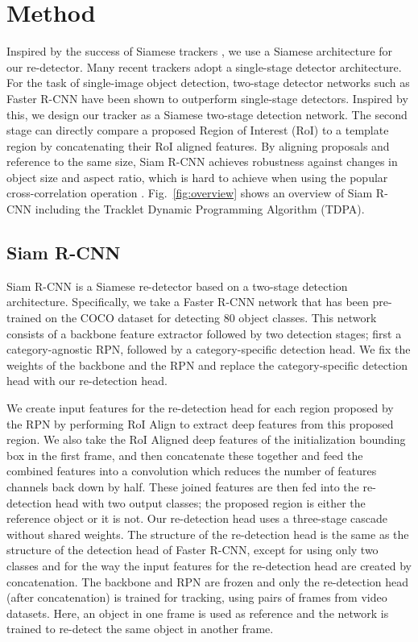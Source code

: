 \documentclass[10pt,twocolumn,letterpaper]{article}
\begin{document}
\section{Method}
Inspired by the success of Siamese trackers \cite{Kristan18ECCVW,Wu15TPAMI,Kristan16TPAMI}, we use a Siamese  architecture for our re-detector.
 Many recent trackers \cite{Zhu18ECCV,Wang19CVPR,Li19CVPR,Li18CVPRSiamRPN,Bhat19ICCV} adopt a single-stage detector architecture. For the task of single-image object detection, two-stage detector networks such as Faster R-CNN \cite{Ren15NIPS} have been shown to outperform single-stage detectors. Inspired by this, we design our tracker as a Siamese two-stage detection network. The second stage can directly compare a proposed Region of Interest (RoI) to a template region by concatenating their RoI aligned features. By aligning proposals and reference to the same size, Siam R-CNN achieves robustness against changes in object size and aspect ratio, which is hard to achieve when using the popular cross-correlation operation \cite{Li18CVPRSiamRPN}.
 Fig.~\ref{fig:overview} shows an overview of Siam R-CNN including the Tracklet Dynamic Programming Algorithm (TDPA).

\subsection{Siam R-CNN}
Siam R-CNN is a Siamese re-detector based on a two-stage detection architecture. Specifically, we take a Faster R-CNN network that has been pre-trained on the COCO \cite{coco} dataset for detecting 80 object classes. This network consists of a backbone feature extractor followed by two detection stages; first a category-agnostic RPN, followed by a category-specific detection head. We fix the weights of the backbone and the RPN and replace the category-specific detection head with our re-detection head.

We create input features for the re-detection head for each region proposed by the RPN by performing RoI Align \cite{He17ICCV} to extract deep features from this proposed region. We also take the RoI Aligned deep features of the initialization bounding box in the first frame, and then concatenate these together and feed the combined features into a  convolution which reduces the number of features channels back down by half.
These joined features are then fed into the re-detection head with two output classes; the proposed region is either the reference object or it is not.
Our re-detection head uses a three-stage cascade \cite{Cai18CVPR} without shared weights. The structure of the re-detection head is the same as the structure of the detection head of Faster R-CNN, except for using only two classes and for the way the input features for the re-detection head are created by concatenation.
The backbone and RPN are frozen and only the re-detection head (after concatenation) is trained for tracking, using pairs of frames from video datasets. Here, an object in one frame is used as reference and the network is trained to re-detect the same object in another frame.
\end{document}
